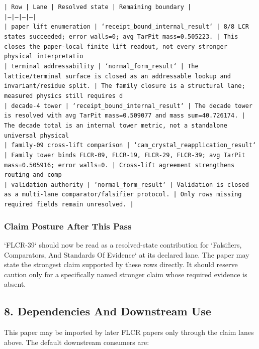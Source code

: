 \documentclass[11pt]{article}
\begin{document}
\noindent\texttt{| Row | Lane | Resolved state | Remaining boundary |}\\
\noindent\texttt{|---|---|---|---|}\\
\noindent\texttt{| paper lift enumeration | `receipt\_bound\_internal\_result` | 8/8 LCR states succeeded; error walls=0; avg TarPit mass=0.505223. | This closes the paper-local finite lift readout, not every stronger physical interpretatio}\\
\noindent\texttt{| terminal addressability | `normal\_form\_result` | The lattice/terminal surface is closed as an addressable lookup and invariant/residue split. | The family closure is a structural lane; measured physics still requires d}\\
\noindent\texttt{| decade-4 tower | `receipt\_bound\_internal\_result` | The decade tower is resolved with avg TarPit mass=0.509077 and mass sum=40.726174. | The decade total is an internal tower metric, not a standalone universal physical }\\
\noindent\texttt{| family-09 cross-lift comparison | `cam\_crystal\_reapplication\_result` | Family tower binds FLCR-09, FLCR-19, FLCR-29, FLCR-39; avg TarPit mass=0.505916; error walls=0. | Cross-lift agreement strengthens routing and comp}\\
\noindent\texttt{| validation authority | `normal\_form\_result` | Validation is closed as a multi-lane comparator/falsifier protocol. | Only rows missing required fields remain unresolved. |}\\

\subsubsection*{Claim Posture After This Pass}

`FLCR-39` should now be read as a resolved-state contribution for `Falsifiers, Comparators, And Standards Of Evidence` at its declared lane. The paper may state the strongest claim supported by these rows directly. It should reserve caution only for a specifically named stronger claim whose required evidence is absent.

\subsection*{8. Dependencies And Downstream Use}

This paper may be imported by later FLCR papers only through the claim lanes
above. The default downstream consumers are:
\end{document}
